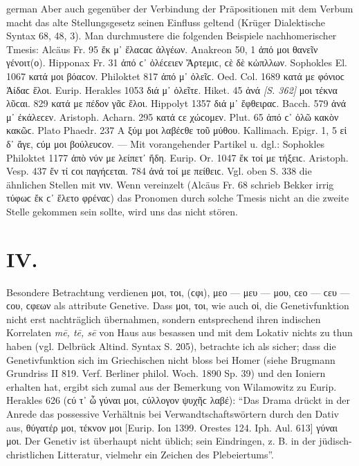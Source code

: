 \begin{otherlanguage*}{german}
Aber auch gegenüber der Verbindung der Prä\-po\-si\-ti\-o\-nen mit dem Ver\-bum macht das alte Stellungsgesetz seinen Einfluss geltend (Krüger Dialektische Syntax 68, 48, 3). Man durchmustere die folgenden Beispiele nachhomerischer Tmesis: Alcäus Fr. 95 ἔκ μ᾽ ἔλαϲαϲ ἀλγέων. Anakreon 50, 1 ἀπό μοι θανεῖν γένοιτ(ο). Hipponax Fr. 31 ἀπό ϲ᾽ ὀλέϲειεν Ἄρτεμιϲ, ϲὲ δὲ κὠπλλων. Sophokles El. 1067 κατά μοι βόαϲον. Philoktet 817 ἀπό μ᾽ ὀλεῖϲ. Oed. Col. 1689 κατά με φόνιοϲ Ἀίδαϲ ἕλοι. Eurip. Herakles 1053 διά μ᾽ ὀλεῖτε. Hiket. 45 ἀνά \hypertarget{p362}{\emph{[S. 362]}}\label{p362} μοι τέκνα λῦϲαι. 829 κατά με πέδον γᾶϲ ἕλοι. Hippolyt 1357 διά μ᾽ ἔφθειραϲ. Bacch. 579 ἀνά μ᾽ ἐκάλεϲεν. Aristoph. Acharn. 295 κατά ϲε χώϲομεν. Plut. 65 ἀπό ϲ᾽ ὀλῶ κακὸν κακῶϲ. Plato Phaedr. 237 Α ξύμ μοι λαβέϲθε τοῦ μύθου. Kallimach. Epigr. 1, 5 εἰ δ᾽ ἄγε, ϲύμ μοι βούλευϲον. — Mit vorangehender Partikel u. dgl.: Sophokles Philoktet 1177 ἀπὸ νύν με λείπετ᾽ ἤδη. Eurip. Or. 1047 ἔκ τοί με τήξειϲ. Aristoph. Vesp. 437 ἔν τί ϲοι παγήϲεται. 784 ἀνά τοί με πείθειϲ. Vgl. oben S. 338 die ähnlichen Stellen mit νιν. Wenn vereinzelt (Alcäus Fr. 68 schrieb Bekker irrig τύφωϲ ἔκ ϲ᾽ ἕλετο φρέναϲ) das Pronomen durch solche Tmesis nicht an die zweite Stelle gekommen sein sollte, wird uns das nicht stören.

\section*{IV.}

Besondere Betrachtung verdienen μοι, τοι, (ϲφι), μεο — μευ — μου, ϲεο — ϲευ — ϲου, ϲφεων als attribute Genetive. Dass μοι, τοι, wie auch οἱ, die Genetivfunktion nicht erst nachträglich übernahmen, sondern entsprechend ihren indischen Korrelaten \emph{mē, tē, sē} von Haus aus besassen und mit dem Lokativ nichts zu thun haben (vgl. Delbrück Altind. Syntax S. 205), betrachte ich als sicher; dass die Genetivfunktion sich im Griechischen nicht bloss bei Homer (siehe Brugmann Grundriss II 819. Verf. Berliner philol. Woch. 1890 Sp. 39) und den Ioniern erhalten hat, ergibt sich zumal aus der Bemerkung von Wilamowitz zu Eurip. Herakles 626 (ϲύ τ᾽ ὦ γύναι μοι, ϲύλλογον ψυχῆϲ λαβέ): “Das Drama drückt in der Anrede das possessive Verhältnis bei Verwandtschaftswörtern durch den Dativ aus, θύγατέρ μοι, τέκνον μοι [Eurip. Ion 1399. Orestes 124. Iph. Aul. 613] γύναι μοι. Der Genetiv ist überhaupt nicht üblich; sein Eindringen, z. B. in der jüdisch-christlichen Litteratur, vielmehr ein Zeichen des Plebeiertums”.


\end{otherlanguage*}
